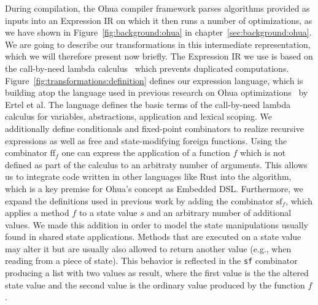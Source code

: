 During compilation, the Ohua compiler framework parses algorithms provided as inputs into an Expression IR on which it then runs a number of optimizations, as we have shown in Figure~\ref{fig:background:ohua} in chapter~\ref{sec:background:ohua}.
We are going to describe our transformations in this intermediate representation, which we will therefore present now briefly.
The Expression IR we use is based on the call-by-need lambda calculus~\cite{ariola1997lambda, ariola1995lambda} which prevents duplicated computations.
Figure~\ref{fig:transformations:definition} defines our expression language, which is building atop the language used in previous research on Ohua optimizations~\cite{ertel2018compiling} by Ertel et al.
The language defines the basic terms of the call-by-need lambda calculus for variables, abstractions, application and lexical scoping.
We additionally define conditionals and fixed-point combinators to realize recursive expressions as well as free and state-modifying foreign functions.
Using the combinator $\text{ff}_f$ one can express the application of a function $f$ which is not defined as part of the calculus to an arbitraty number of arguments.
This allows us to integrate code written in other languages like Rust into the algorithm, which is a key premise for Ohua's concept as Embedded DSL.
Furthermore, we expand the definitions used in previous work by adding the combinator $\text{sf}_f$, which applies a method $f$ to a state value $s$ and an arbitrary number of additional values.
We made this addition in order to model the state manipulations usually found in shared state applications.
Methods that are executed on a state value may alter it but are usually also allowed to return another value (e.g., when reading from a piece of state).
This behavior is reflected in the \texttt{sf} combinator producing a list with two values as result, where the first value is the the altered state value and the second value is the ordinary value produced by the function $f$.

